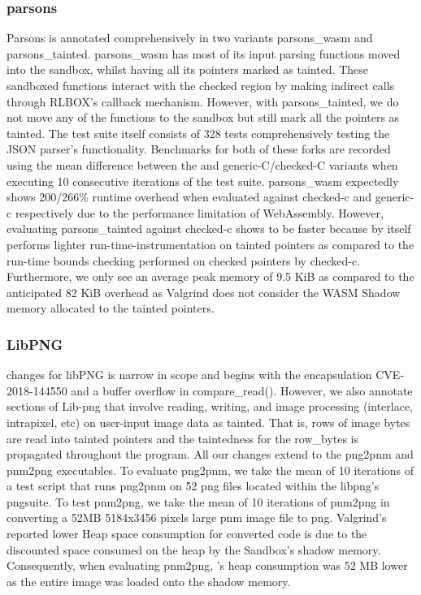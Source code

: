 \subsubsection{parsons}
Parsons is annotated comprehensively in two variants parsons\_wasm and parsons\_tainted. parsons\_wasm has most of its input parsing functions moved into the sandbox, whilst having all its pointers marked as tainted. These sandboxed functions interact with the checked region by making indirect calls through RLBOX's callback mechanism. However, with parsons\_tainted, we do not move any of the functions to the sandbox but still mark all the pointers as tainted. The test suite itself consists of 328 tests comprehensively testing the JSON parser's functionality. Benchmarks for both of these forks are recorded using the mean difference between the \systemname and generic-C/checked-C variants when executing 10 consecutive iterations of the test suite. parsons\_wasm expectedly shows 200/266\% runtime overhead when evaluated against checked-c and generic-c respectively due to the performance limitation of WebAssembly. However, evaluating parsons\_tainted against checked-c shows \systemname to be faster because \systemname by itself performs lighter run-time-instrumentation on tainted pointers as compared to the run-time bounds checking performed on checked pointers by checked-c. Furthermore, we only see an average peak memory of 9.5 KiB as compared to the anticipated 82 KiB overhead as Valgrind does not consider the WASM Shadow memory allocated to the tainted pointers.

\subsubsection{LibPNG}
\systemname changes for libPNG is narrow in scope and begins with the encapsulation CVE-2018-144550 and a buffer overflow in compare\_read(). However, we also annotate sections of Lib-png that involve reading, writing, and image processing (interlace, intrapixel, etc) on user-input image data as tainted. That is, rows of image bytes are read into tainted pointers and the taintedness for the row\_bytes is propagated throughout the program. All our changes extend to the png2pnm and pnm2png executables. To evaluate png2pnm, we take the mean of 10 iterations of a test script that runs png2pnm on 52 png files located within the libpng's pngsuite. To test pnm2png, we take the mean of 10 iterations of pnm2png in converting a 52MB 5184x3456 pixels large pnm image file to png. Valgrind's reported lower Heap space consumption for \systemname converted code is due to the discounted space consumed on the heap by the Sandbox's shadow memory. Consequently, when evaluating pnm2png, \systemname's heap consumption was 52 MB lower as the entire image was loaded onto the shadow memory.  

